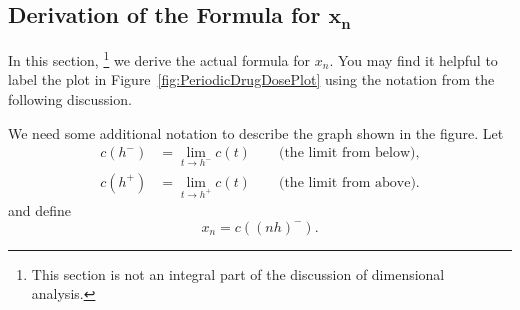 \subsection*{Derivation of the Formula for $\pmb{x_{n}}$}%
In this section,%
\footnote{This section is not an integral part of the
discussion of dimensional analysis.}
we derive the actual formula for
$x_n$. 
You may find it helpful to label the plot in
Figure~\ref{fig:PeriodicDrugDosePlot} using the notation
from the following discussion.

We need some additional notation to describe the
graph shown in the figure.
Let
\begin{equation}
\begin{split}
    c(h^{-})  & = \lim_{t\rightarrow h^{-}} c(t)
                     \quad\quad \textrm{(the limit from below),} \\
    c(h^{+})  & = \lim_{t\rightarrow h^{+}} c(t)
                     \quad\quad \textrm{(the limit from above).}
\end{split}
\end{equation}
and define
\begin{equation}
   x_n = c((nh)^{-}).
\end{equation}

